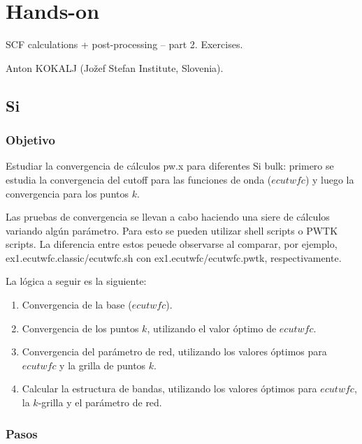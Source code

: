 \section{Hands-on}

     SCF calculations + post-processing – part 2. Exercises.

    	Anton KOKALJ (Jožef Stefan Institute, Slovenia).

\subsection{Si}

\subsubsection{Objetivo}

  Estudiar la convergencia de cálculos pw.x para diferentes Si bulk: primero se estudia la convergencia del cutoff para las funciones de onda ($ecutwfc$) y luego la convergencia para los puntos $k$.

  Las pruebas de convergencia se llevan a cabo haciendo una siere de cálculos variando algún parámetro. Para esto se pueden utilizar shell scripts o PWTK scripts. La diferencia entre estos peuede observarse al comparar, por ejemplo, ex1.ecutwfc.classic/ecutwfc.sh con ex1.ecutwfc/ecutwfc.pwtk, respectivamente.

  La lógica a seguir es la siguiente:
    \begin{enumerate}
      \item Convergencia de la base ($ecutwfc$).
      \item Convergencia de los puntos $k$, utilizando el valor óptimo de $ecutwfc$.
      \item Convergencia del parámetro de red, utilizando los valores óptimos para $ecutwfc$ y la grilla de puntos $k$.
      \item Calcular la estructura de bandas, utilizando los valores óptimos para $ecutwfc$, la $k$-grilla y el parámetro de red.
    \end{enumerate}

\subsubsection{Pasos}

